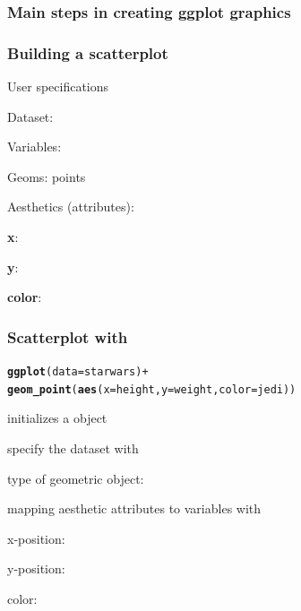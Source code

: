 \documentclass[12pt]{beamer}\usepackage[]{graphicx}\usepackage[]{color}
\makeatletter
\newcommand{\hlopt}[1]{\textcolor[rgb]{0,0,0}{#1}}%
\newcommand{\hlstd}[1]{\textcolor[rgb]{0.345,0.345,0.345}{#1}}%
\newcommand{\hlkwc}[1]{\textcolor[rgb]{0.333,0.667,0.333}{#1}}%
\newcommand{\hlkwd}[1]{\textcolor[rgb]{0.737,0.353,0.396}{\textbf{#1}}}%
\newenvironment{kframe}{%
 \def\at@end@of@kframe{}%
 \ifinner\ifhmode%
  \def\at@end@of@kframe{\end{minipage}}%
  \begin{minipage}{\columnwidth}%
 \fi\fi%
 \def\FrameCommand##1{\hskip\@totalleftmargin \hskip-\fboxsep
 \colorbox{shadecolor}{##1}\hskip-\fboxsep
     \hskip-\linewidth \hskip-\@totalleftmargin \hskip\columnwidth}%
 \MakeFramed {\advance\hsize-\width
   \@totalleftmargin\z@ \linewidth\hsize
   \@setminipage}}%
 {\par\unskip\endMakeFramed%
 \at@end@of@kframe}
\newenvironment{knitrout}{}{} %
\makeatother
\begin{document}

\begin{frame}
\frametitle{Main steps in creating ggplot graphics}
\begin{center}
\end{center}
\end{frame}


\begin{frame}[fragile]
\frametitle{Building a scatterplot}

User specifications
\bi
  \item Dataset:  
  \item Variables: 
  \item Geoms: points
  \item Aesthetics (attributes):
  \bi
    \item \textbf{x}: 
    \item \textbf{y}: 
    \item \textbf{color}: 
  \ei
\ei

\end{frame}


\begin{frame}[fragile]
\frametitle{Scatterplot with }
\begin{knitrout}\footnotesize
{}\color{fgcolor}\begin{kframe}
\begin{alltt}
\hlkwd{ggplot}\hlstd{(}\hlkwc{data} \hlstd{= starwars)} \hlopt{+}
  \hlkwd{geom_point}\hlstd{(}\hlkwd{aes}\hlstd{(}\hlkwc{x} \hlstd{= height,} \hlkwc{y} \hlstd{= weight,} \hlkwc{color} \hlstd{= jedi))}
\end{alltt}
\end{kframe}
\end{knitrout}

\pause
\bi
  \item {\hilit {}} initializes a  object
  \item specify the dataset with {\mdlit {}}
  \item type of geometric object: {\hilit {}}
  \item mapping aesthetic attributes to variables with {\hilit {}}
  \bi
    \item x-position: 
    \item y-position: 
    \item color: 
  \ei
\ei
\end{frame}
\end{document}
